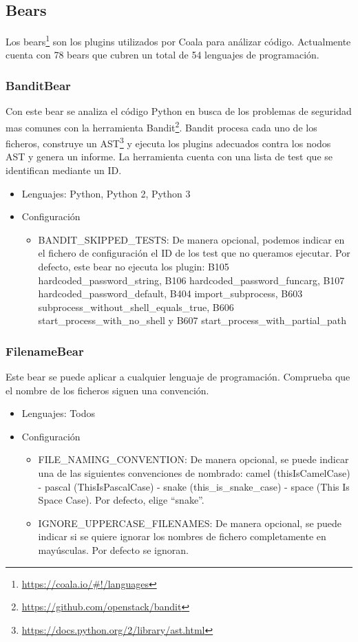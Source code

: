 \documentclass[a4paper, 12pt]{book}
\begin{document}
\subsection{Bears}
\label{sec:seccion1.2}
Los bears\footnote{\url{https://coala.io/#!/languages}} son los plugins utilizados por Coala para análizar código. Actualmente cuenta con 78 bears que cubren un total de 54 lenguajes de programación.

\subsubsection{BanditBear}
\label{sec:seccion1.2.1}
Con este bear se analiza el código Python en busca de los problemas de seguridad mas comunes con la herramienta Bandit\footnote{\url{https://github.com/openstack/bandit}}. Bandit procesa cada uno de los ficheros, construye un AST\footnote{\url{https://docs.python.org/2/library/ast.html}} y ejecuta los plugins adecuados contra los nodos AST y genera un informe. La herramienta cuenta con una lista de test que se identifican mediante un ID.

\begin{itemize}
  \item Lenguajes: Python, Python 2, Python 3
  \item Configuración
    \begin{itemize}
          \item BANDIT\_SKIPPED\_TESTS: De manera opcional, podemos indicar en el fichero de configuración el ID de los test que no queramos ejecutar. Por defecto, este bear no ejecuta los plugin: B105  hardcoded\_password\_string, B106  hardcoded\_password\_funcarg, B107  hardcoded\_password\_default, B404  import\_subprocess, B603  subprocess\_without\_shell\_equals\_true, B606  start\_process\_with\_no\_shell y B607  start\_process\_with\_partial\_path
    \end{itemize}
\end{itemize}

\subsubsection{FilenameBear}
\label{sec:seccion1.2.2}
Este bear se puede aplicar a cualquier lenguaje de programación. Comprueba que el nombre de los ficheros siguen una convención.

\begin{itemize}
  \item Lenguajes: Todos
  \item Configuración
    \begin{itemize}
          \item FILE\_NAMING\_CONVENTION: De manera opcional, se puede indicar una de las siguientes convenciones de nombrado: camel (thisIsCamelCase) - pascal (ThisIsPascalCase) - snake (this\_is\_snake\_case) - space (This Is Space Case). Por defecto, elige “snake”.
          \item IGNORE\_UPPERCASE\_FILENAMES: De manera opcional, se puede indicar si se quiere ignorar los nombres de fichero completamente en mayúsculas. Por defecto se ignoran.
    \end{itemize}
\end{itemize}
\end{document}

